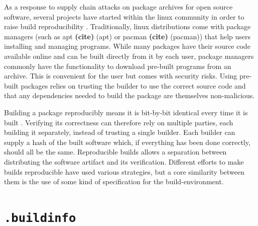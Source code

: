 \documentclass[english, biblatex, digitaloutput]{kththesis}
\begin{document}
As a response to supply chain attacks on package archives for open source software, several projects have started within the linux community in order to raise build reproducibility \cite{reproducible_builds_project}. Traditionally, linux distributions come with package managers (such as apt \textbf{(cite)} (apt) or pacman \textbf{(cite)} (pacman)) that help users installing and managing programs. While many packages have their source code available online and can be built directly from it by each user, package managers commonly have the functionality to download pre-built programs from an archive. This is convenient for the user but comes with security risks. Using pre-built packages relies on trusting the builder to use the correct source code and that any dependencies needed to build the package are themselves non-malicious.

Building a package reproducibly means it is bit-by-bit identical every time it is built \cite{lamb_reproducible_2021}. Verifying its correctness can therefore rely on multiple parties, each building it separately, instead of trusting a single builder. Each builder can supply a hash of the built software which, if everything has been done correctly, should all be the same. Reproducible builds allows a separation between distributing the software artifact and its verification. Different efforts to make builds reproducible have used various strategies, but a core similarity between them is the use of some kind of specification for the build-environment.





\section{\texttt{.buildinfo}}
\end{document}
